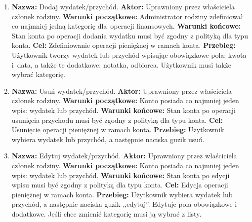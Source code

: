 \begin{enumerate}[labelwidth=1em,label=\arabic*.]
\item \textbf{Nazwa:} Dodaj wydatek/przychód. \newline
    \textbf{Aktor:} Uprawniony przez właściciela członek rodziny. \newline
    \textbf{Warunki początkowe:} Administrator rodziny zdefiniował co najmniej jedną kategorię dla~operacji finansowych. \newline
    \textbf{Warunki końcowe:} Stan konta po operacji dodania wydatku musi być zgodny z polityką dla typu konta. \newline
    \textbf{Cel:} Zdefiniowanie operacji pieniężnej w ramach konta. \newline
    \textbf{Przebieg:} Użytkownik tworzy wydatek lub przychód wpisując obowiązkowe pola: kwota i~data, a także te dodatkowe: notatka, odbiorca. Użytkownik musi także wybrać kategorię. 
\item \textbf{Nazwa:} Usuń wydatek/przychód. \newline
    \textbf{Aktor:} Uprawniony przez właściciela członek rodziny. \newline
    \textbf{Warunki początkowe:} Konto posiada co najmniej jeden wpis: wydatek lub przychód. \newline
    \textbf{Warunki końcowe:} Stan konta po operacji usunięcia przychodu musi być zgodny z polityką dla typu konta. \newline
    \textbf{Cel:} Usunięcie operacji pieniężnej w ramach konta. \newline
    \textbf{Przebieg:} Użytkownik wybiera wydatek lub przychód, a następnie naciska guzik usuń. 
\item \textbf{Nazwa:} Edytuj wydatek/przychód. \newline
    \textbf{Aktor:} Uprawniony przez właściciela członek rodziny. \newline
    \textbf{Warunki początkowe:} Konto posiada co najmniej jeden wpis: wydatek lub przychód. \newline
    \textbf{Warunki końcowe:} Stan konta po edycji wpisu musi być zgodny z polityką dla typu konta. \newline
    \textbf{Cel:} Edycja operacji pieniężnej w ramach konta. \newline
    \textbf{Przebieg:} Użytkownik wybiera wydatek lub przychód, a następnie naciska guzik ,,edytuj''. Edytuje pola obowiązkowe i dodatkowe. Jeśli chce zmienić kategorię musi ją wybrać z listy. \newline

\end{enumerate}
